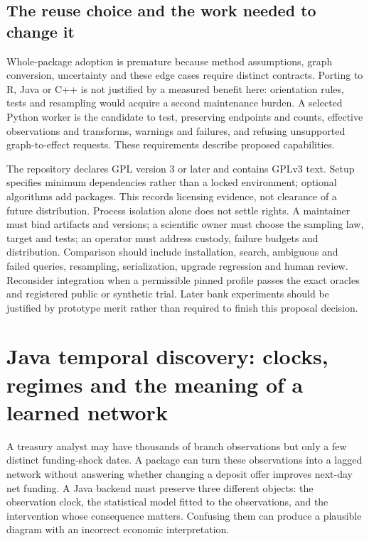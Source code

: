 \subsection{The reuse choice and the work needed to change it}
\label{exec23:tigramite-choice}
Whole-package adoption is premature because method assumptions, graph conversion, uncertainty and these edge cases require distinct contracts. Porting to R, Java or C++ is not justified by a measured benefit here: orientation rules, tests and resampling would acquire a second maintenance burden. A selected Python worker is the candidate to test, preserving endpoints and counts, effective observations and transforms, warnings and failures, and refusing unsupported graph-to-effect requests. These requirements describe proposed capabilities.

The repository declares GPL version 3 or later and contains GPLv3 text. Setup specifies minimum dependencies rather than a locked environment; optional algorithms add packages. This records licensing evidence, not clearance of a future distribution. Process isolation alone does not settle rights. A maintainer must bind artifacts and versions; a scientific owner must choose the sampling law, target and tests; an operator must address custody, failure budgets and distribution. Comparison should include installation, search, ambiguous and failed queries, resampling, serialization, upgrade regression and human review. Reconsider integration when a permissible pinned profile passes the exact oracles and registered public or synthetic trial. Later bank experiments should be justified by prototype merit rather than required to finish this proposal decision. \citep{exec23_tigramite_reuse_source,exec23_tigramite_reference}


\section{Java temporal discovery: clocks, regimes and the meaning of a learned network}
\label{exec15:java-temporal}

A treasury analyst may have thousands of branch observations but only a few
distinct funding-shock dates. A package can turn these observations into a
lagged network without answering whether changing a deposit offer improves
next-day net funding. A Java backend must preserve three different objects:
the observation clock, the statistical model fitted to the observations, and
the intervention whose consequence matters. Confusing them can produce a
plausible diagram with an incorrect economic interpretation.

